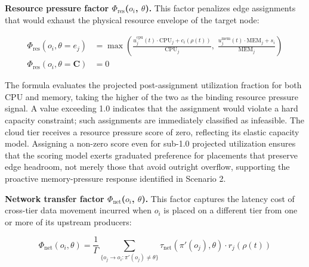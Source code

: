 \documentclass[preprint,review,12pt]{elsarticle}
\begin{document}
\textbf{Resource pressure factor $\Phi_{\text{res}}$($o_i$, $\theta$).} This factor penalizes edge assignments that would exhaust the physical resource envelope of the target node:

\begin{align}
\Phi_{\text{res}}(o_i, \theta = e_j) &= \max\!\left(\frac{u_j^{\text{cpu}}(t) \cdot \text{CPU}_j + c_i(\rho(t))}{\text{CPU}_j},\; \frac{u_j^{\text{mem}}(t) \cdot \text{MEM}_j + s_i}{\text{MEM}_j}\right) \label{eq:phi-res} \\
\Phi_{\text{res}}(o_i, \theta = \mathbf{C}) &= 0 \nonumber
\end{align}

The formula evaluates the projected post-assignment utilization fraction for both CPU and memory, taking the higher of the two as the binding resource pressure signal. A value exceeding 1.0 indicates that the assignment would violate a hard capacity constraint; such assignments are immediately classified as infeasible. The cloud tier receives a resource pressure score of zero, reflecting its elastic capacity model. Assigning a non-zero score even for sub-1.0 projected utilization ensures that the scoring model exerts graduated preference for placements that preserve edge headroom, not merely those that avoid outright overflow, supporting the proactive memory-pressure response identified in Scenario 2.

\textbf{Network transfer factor $\Phi_{\text{net}}$($o_i$, $\theta$).} This factor captures the latency cost of cross-tier data movement incurred when $o_i$ is placed on a different tier from one or more of its upstream producers:

\begin{equation}
\Phi_{\text{net}}(o_i, \theta) = \frac{1}{\Gamma} \sum_{\{o_j \to o_i : \pi'(o_j) \neq \theta\}} \tau_{\text{net}}(\pi'(o_j), \theta) \cdot r_j(\rho(t))
\label{eq:phi-net}
\end{equation}
\end{document}
